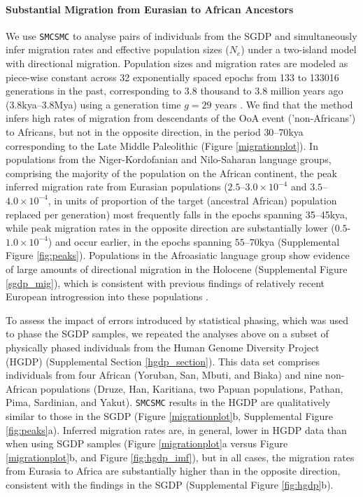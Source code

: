 \documentclass{article}
\begin{document}
\paragraph{Substantial Migration from Eurasian to African Ancestors} We use {\tt SMCSMC} to analyse pairs of individuals from the SGDP and simultaneously infer migration rates and effective population sizes ($N_e$) under a two-island model with directional migration.  Population sizes and migration rates are modeled as piece-wise constant across 32 exponentially spaced epochs from 133 to 133016 generations in the past, corresponding to 3.8 thousand to 3.8 million years ago (3.8kya--3.8Mya) using a generation time $g=29$ years \cite{Fenner2005}.  We find that the method infers high rates of migration from descendants of the OoA event ('non-Africans') to Africans, but not in the opposite direction, in the period $30$--$70$kya corresponding to the Late Middle Paleolithic (Figure \ref{migrationplot}). In populations from the Niger-Kordofanian and Nilo-Saharan language groups, comprising the majority of the population on the African continent, the peak inferred migration rate from Eurasian populations ($2.5$--$3.0\times 10^{-4}$ and $3.5$--$4.0\times 10^{-4}$, in units of proportion of the target (ancestral African) population replaced per generation) most frequently falls in the epochs spanning 35--45kya, while peak migration rates in the opposite direction are substantially lower ($0.5$-$1.0\times 10^{-4}$) and occur earlier, in the epochs spanning $55$--$70$kya (Supplemental Figure \ref{fig:peaks}). Populations in the Afroasiatic language group show evidence of large amounts of directional migration in the Holocene (Supplemental Figure \ref{sgdp_mig}), which is consistent with previous findings of relatively recent European introgression into these populations \cite{Busby2016, Fan2019}. 

To assess the impact of errors introduced by statistical phasing, which was used to phase the SGDP samples, we repeated the analyses above on a subset of physically phased individuals from the Human Genome Diversity Project (HGDP) \cite{Mallick2016} (Supplemental Section \ref{hgdp_section}). This data set comprises individuals from four African (Yoruban, San, Mbuti, and Biaka) and nine non-African populations (Druze, Han, Karitiana, two Papuan populations, Pathan, Pima, Sardinian, and Yakut). {\tt SMCSMC} results in the HGDP are qualitatively similar to those in the SGDP (Figure \ref{migrationplot}b, Supplemental Figure \ref{fig:peaks}a). Inferred migration rates are, in general, lower in HGDP data than when using SGDP samples (Figure \ref{migrationplot}a versus Figure \ref{migrationplot}b, and Figure \ref{fig:hgdp_imf}), but in all cases, the migration rates from Eurasia to Africa are substantially higher than in the opposite direction, consistent with the findings in the SGDP (Supplemental Figure \ref{fig:hgdp}b). 
\end{document}
